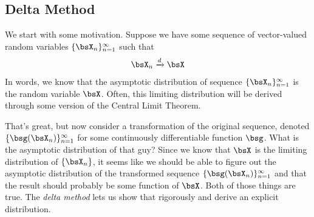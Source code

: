 \documentclass[12pt]{article}
\theoremstyle{plain}
\theoremstyle{definition}
\theoremstyle{remark}
\newcommand{\dto}{\xrightarrow{d}}
\newcommand{\ninf}{_{n=1}^\infty}
\begin{document}
\clearpage
\subsection{Delta Method}

We start with some motivation.
Suppose we have some sequence of vector-valued random variables
$\{\bsX_n\}\ninf$ such that
\begin{align*}
  \bsX_n \dto \bsX
\end{align*}
In words, we know that the asymptotic distribution of sequence
$\{\bsX_n\}\ninf$ is the random variable $\bsX$.
Often, this limiting distribution will be derived through some version
of the Central Limit Theorem.

That's great, but now consider a transformation of the original
sequence, denoted $\{\bsg(\bsX_n)\}\ninf$ for some continuously
differentiable function $\bsg$. What is the asymptotic distribution of
that guy? Since we know that $\bsX$ is the limiting distribution of
$\{\bsX_n\}$, it seems like we should be able to figure out the
asymptotic distribution of the transformed sequence
$\{\bsg(\bsX_n)\}\ninf$ and that the result should probably be some
function of $\bsX$. Both of those things are true. The
\emph{delta method} lets us show that rigorously and derive an explicit
distribution.
\end{document}
